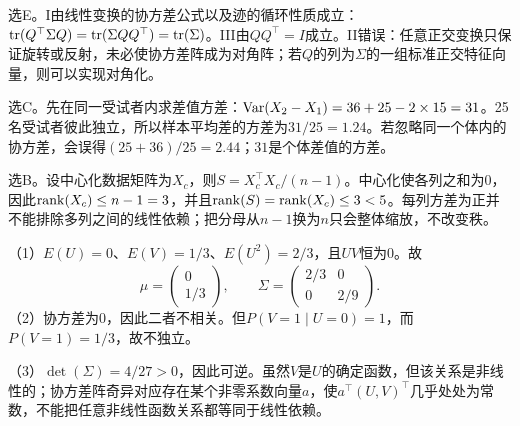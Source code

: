 选E。I由线性变换的协方差公式以及迹的循环性质成立：$\operatorname{tr}(Q^\top\Sigma Q)=\operatorname{tr}(\Sigma QQ^\top)=\operatorname{tr}(\Sigma)$。III由$QQ^\top=I$成立。II错误：任意正交变换只保证旋转或反射，未必使协方差阵成为对角阵；若$Q$的列为$\Sigma$的一组标准正交特征向量，则可以实现对角化。
\par\nobreak\smallskip{}

选C。先在同一受试者内求差值方差：$\operatorname{Var}(X_2-X_1)=36+25-2\times15=31$。25名受试者彼此独立，所以样本平均差的方差为$31/25=1.24$。若忽略同一个体内的协方差，会误得$(25+36)/25=2.44$；$31$是个体差值的方差。
\par\nobreak\smallskip{}

选B。设中心化数据矩阵为$X_c$，则$S=X_c^\top X_c/(n-1)$。中心化使各列之和为0，因此$\operatorname{rank}(X_c)\leq n-1=3$，并且$\operatorname{rank}(S)=\operatorname{rank}(X_c)\leq3<5$。每列方差为正并不能排除多列之间的线性依赖；把分母从$n-1$换为$n$只会整体缩放，不改变秩。
\par\nobreak\smallskip{}

（1）$E(U)=0$、$E(V)=1/3$、$E(U^2)=2/3$，且$UV$恒为0。故
\[
\mu=\begin{pmatrix}0\\1/3\end{pmatrix},\qquad
\Sigma=\begin{pmatrix}2/3&0\\0&2/9\end{pmatrix}.
\]
（2）协方差为0，因此二者不相关。但$P(V=1\mid U=0)=1$，而$P(V=1)=1/3$，故不独立。

（3）$\det(\Sigma)=4/27>0$，因此可逆。虽然$V$是$U$的确定函数，但该关系是非线性的；协方差阵奇异对应存在某个非零系数向量$a$，使$a^\top(U,V)^\top$几乎处处为常数，不能把任意非线性函数关系都等同于线性依赖。
\par\nobreak\smallskip{}


